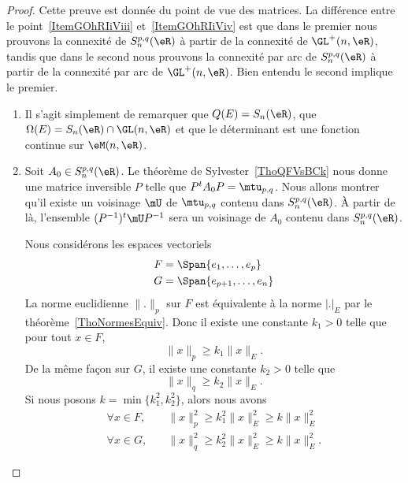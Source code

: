\begin{proof}
	Cette preuve est donnée du point de vue des matrices. La différence entre le point~\ref{ItemGOhRIiViii} et~\ref{ItemGOhRIiViv} est que dans le premier nous prouvons la connexité de \( S_n^{p,q}(\eR)\) à partir de la connexité de \( \GL^+(n,\eR)\), tandis que dans le second nous prouvons la connexité par arc de \( S_n^{p,q}(\eR)\) à partir de la connexité par arc de \( \GL^+(n,\eR)\). Bien entendu le second implique le premier.
	\begin{enumerate}
		\item
		      Il s'agit simplement de remarquer que \( Q(E)=S_n(\eR)\), que \( \Omega(E)=S_n(\eR)\cap\GL(n,\eR)\) et que le déterminant est une fonction continue sur \( \eM(n,\eR)\).
		\item
		      Soit \( A_0\in S_n^{p,q}(\eR)\). Le théorème de Sylvester~\ref{ThoQFVsBCk} nous donne une matrice inversible \( P\) telle que \( P^tA_0P=\mtu_{p,q}\). Nous allons montrer qu'il existe un voisinage \( \mU\) de \( \mtu_{p,q}\) contenu dans \( S_n^{p,q}(\eR)\). À partir de là, l'ensemble \( (P^{-1})^t\mU P^{-1}\) sera un voisinage de \( A_0\) contenu dans \( S_n^{p,q}(\eR)\).

		      Nous considérons les espaces vectoriels
		      \begin{subequations}
			      \begin{align}
				      F & =\Span\{ e_1,\ldots, e_p \}     \\
				      G & =\Span\{ e_{p+1},\ldots, e_n \}
			      \end{align}
		      \end{subequations}
		      La norme euclidienne \( \| . \|_p\) sur \( F\) est équivalente à la norme \( | . |_E\) par le théorème~\ref{ThoNormesEquiv}. Donc il existe une constante \( k_1>0\) telle que pour tout \( x\in F\),
		      \begin{equation}    \label{EqMViCjJJ}
			      \| x \|_p\geq k_1\| x \|_E.
		      \end{equation}
		      De la même façon sur \( G\), il existe une constante \( k_2>0\) telle que
		      \begin{equation}    \label{EqSFwOcDw}
			      \| x \|_q\geq k_2\| x \|_E.
		      \end{equation}
		      Si nous posons \( k=\min\{ k_1^2,k_2^2 \}\), alors nous avons
		      \begin{subequations}
			      \begin{align}
				      \forall x\in F,\quad & \| x \|_p^2\geq k_1^2\| x \|_E^2\geq k\| x \|_E^2  \\
				      \forall x\in G,\quad & \| x \|_q^2\geq k_2^2\| x \|_E^2\geq k\| x \|_E^2.
			      \end{align}
		      \end{subequations}


\end{enumerate}
\end{proof}
